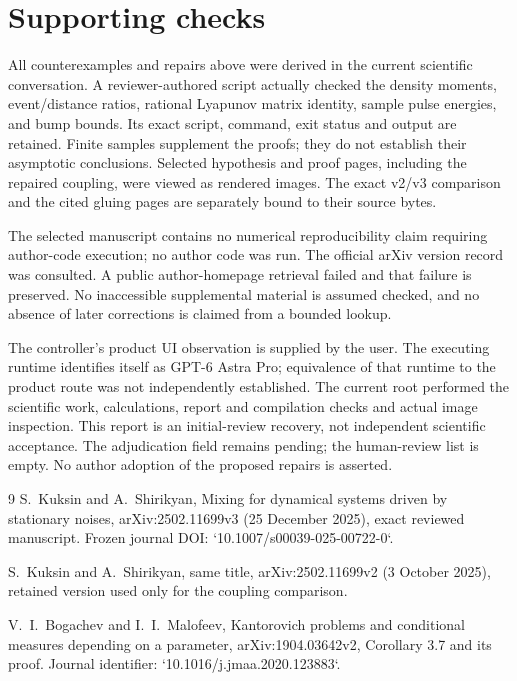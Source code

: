 \documentclass[10pt]{article}
\begin{document}
\section*{Supporting checks}
All counterexamples and repairs above were derived in the current scientific conversation. A reviewer-authored script actually checked the density moments, event/distance ratios, rational Lyapunov matrix identity, sample pulse energies, and bump bounds. Its exact script, command, exit status and output are retained. Finite samples supplement the proofs; they do not establish their asymptotic conclusions. Selected hypothesis and proof pages, including the repaired coupling, were viewed as rendered images. The exact v2/v3 comparison and the cited gluing pages are separately bound to their source bytes.\par
The selected manuscript contains no numerical reproducibility claim requiring author-code execution; no author code was run. The official arXiv version record was consulted. A public author-homepage retrieval failed and that failure is preserved. No inaccessible supplemental material is assumed checked, and no absence of later corrections is claimed from a bounded lookup.\par
The controller’s product UI observation is supplied by the user. The executing runtime identifies itself as GPT-6 Astra Pro; equivalence of that runtime to the product route was not independently established. The current root performed the scientific work, calculations, report and compilation checks and actual image inspection. This report is an initial-review recovery, not independent scientific acceptance. The adjudication field remains pending; the human-review list is empty. No author adoption of the proposed repairs is asserted.\par
9 S. Kuksin and A. Shirikyan, Mixing for dynamical systems driven by stationary noises, arXiv:2502.11699v3 (25 December 2025), exact reviewed manuscript. Frozen journal DOI: `10.1007/s00039-025-00722-0`.\par
S. Kuksin and A. Shirikyan, same title, arXiv:2502.11699v2 (3 October 2025), retained version used only for the coupling comparison.\par
V. I. Bogachev and I. I. Malofeev, Kantorovich problems and conditional measures depending on a parameter, arXiv:1904.03642v2, Corollary 3.7 and its proof. Journal identifier: `10.1016/j.jmaa.2020.123883`.\par
\end{document}
